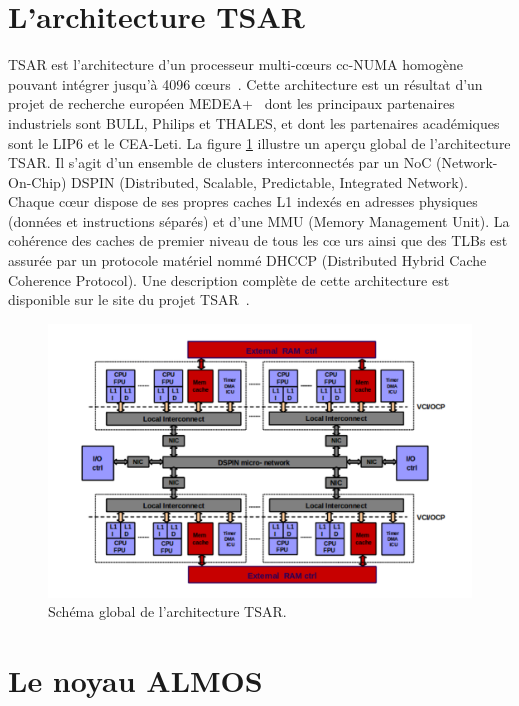   \section{L'architecture TSAR}

    TSAR est l'architecture d’un processeur multi-c\oe urs cc-NUMA homogène
    pouvant intégrer jusqu’à 4096 c\oe urs~\cite{greiner2009tsar}. Cette
    architecture est un résultat d’un projet de recherche européen
    MEDEA+~\cite{tsar2008} dont les principaux partenaires industriels sont
    BULL, Philips et THALES, et dont les partenaires académiques sont le LIP6 et
    le CEA-Leti. La figure \ref{fig:tsar} illustre un aperçu global de
    l'architecture TSAR. Il s'agit d'un ensemble de clusters interconnectés par
    un NoC (Network-On-Chip) DSPIN (Distributed, Scalable, Predictable,
    Integrated Network). Chaque c\oe ur dispose de ses propres caches L1 indexés
    en adresses physiques (données et instructions séparés) et d'une MMU (Memory
    Management Unit). La cohérence des caches de premier niveau de tous les c\oe
    urs ainsi que des TLBs est assurée par un protocole matériel nommé DHCCP
    (Distributed Hybrid Cache Coherence Protocol). Une description complète de
    cette architecture est disponible sur le site du projet
    TSAR~\cite{tsar2008web}.

    \begin{figure}[!h]
      \centering \includegraphics[scale=0.2]{include/img/tsar.png}
      \caption{Schéma global de l'architecture TSAR.~\cite{greiner2009tsar}}
      \label{fig:tsar}
    \end{figure}
  
  \section{Le noyau ALMOS}


